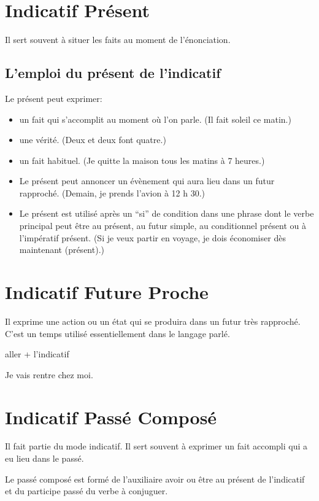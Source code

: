 \documentclass{article}
\begin{document}
\section{Indicatif Présent}

Il sert souvent à situer les faits au moment de l'énonciation.

\subsection{L'emploi du présent de l'indicatif}

Le présent peut exprimer:
\begin{itemize}
\item un fait qui s'accomplit au moment où l'on parle. (Il fait soleil ce matin.)
\item une vérité. (Deux et deux font quatre.)
\item un fait habituel. (Je quitte la maison tous les matins à 7 heures.)
\item Le présent peut annoncer un évènement qui aura lieu dans un futur rapproché. (Demain, je prends l'avion à 12 h 30.)
\item Le présent est utilisé après un ``si'' de condition dans une phrase dont le verbe principal peut être au présent, au futur simple, au conditionnel présent ou à l'impératif présent. (Si je veux partir en voyage, je dois économiser dès maintenant (présent).)
\end{itemize}


\section{Indicatif Future Proche}


Il exprime une action ou un état qui se produira dans un futur très rapproché. C’est un temps utilisé essentiellement dans le langage parlé.

\begin{tcolorbox}
aller + l'indicatif  
\end{tcolorbox}

Je vais rentre chez moi.

\section{Indicatif Passé Composé}

Il fait partie du mode indicatif. Il sert souvent à exprimer un fait accompli qui a eu lieu dans le passé.

Le passé composé est formé de l'auxiliaire avoir ou être au présent de l'indicatif et du partici​pe passé du verbe à conjuguer.
\end{document}
